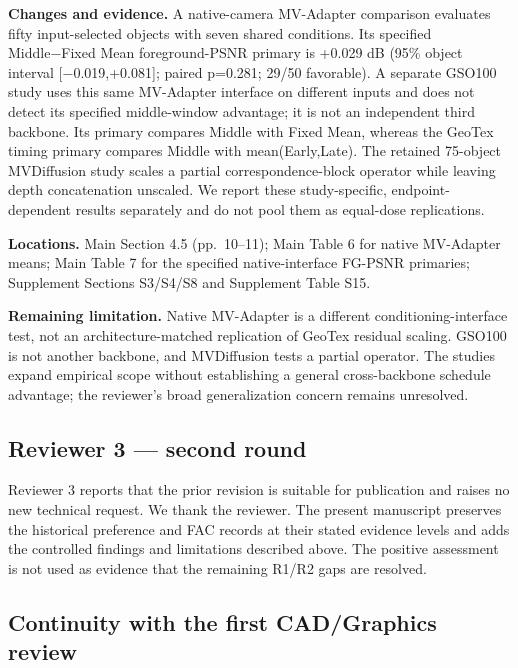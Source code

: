 \documentclass[
  10pt,
]{article}
\begin{document}
\textbf{Changes and evidence.} A native-camera MV-Adapter comparison
evaluates fifty input-selected objects with seven shared conditions. Its
specified Middle−Fixed Mean foreground-PSNR primary is +0.029 dB (95\%
object interval {[}−0.019,+0.081{]}; paired p=0.281; 29/50 favorable). A
separate GSO100 study uses this same MV-Adapter interface on different
inputs and does not detect its specified middle-window advantage; it is
not an independent third backbone. Its primary compares Middle with
Fixed Mean, whereas the GeoTex timing primary compares Middle with
mean(Early,Late). The retained 75-object MVDiffusion study scales a
partial correspondence-block operator while leaving depth concatenation
unscaled. We report these study-specific, endpoint-dependent results
separately and do not pool them as equal-dose replications.

\textbf{Locations.} Main Section 4.5 (pp.~10--11); Main Table 6 for
native MV-Adapter means; Main Table 7 for the specified native-interface
FG-PSNR primaries; Supplement Sections S3/S4/S8 and Supplement Table
S15.

\textbf{Remaining limitation.} Native MV-Adapter is a different
conditioning-interface test, not an architecture-matched replication of
GeoTex residual scaling. GSO100 is not another backbone, and MVDiffusion
tests a partial operator. The studies expand empirical scope without
establishing a general cross-backbone schedule advantage; the reviewer's
broad generalization concern remains unresolved.

\hypertarget{reviewer-3-second-round}{%
\subsection{Reviewer 3 --- second round}\label{reviewer-3-second-round}}

Reviewer 3 reports that the prior revision is suitable for publication
and raises no new technical request. We thank the reviewer. The present
manuscript preserves the historical preference and FAC records at their
stated evidence levels and adds the controlled findings and limitations
described above. The positive assessment is not used as evidence that
the remaining R1/R2 gaps are resolved.

\hypertarget{continuity-with-the-first-cadgraphics-review}{%
\subsection{Continuity with the first CAD/Graphics
review}\label{continuity-with-the-first-cadgraphics-review}}
\end{document}

